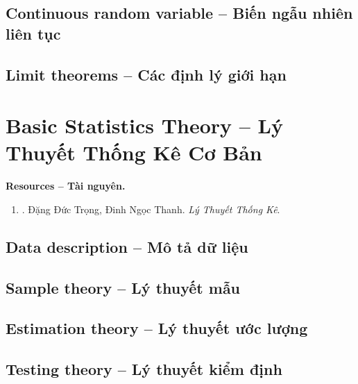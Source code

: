 \documentclass{article}
\begin{document}

\subsection{Continuous random variable -- Biến ngẫu nhiên liên tục}


\subsection{Limit theorems -- Các định lý giới hạn}


\section{Basic Statistics Theory -- Lý Thuyết Thống Kê Cơ Bản}
\textbf{\textsf{Resources -- Tài nguyên.}}
\begin{enumerate}
	\item \cite{Trong_Thanh_thong_ke}. {\sc Đặng Đức Trọng, Đinh Ngọc Thanh}. {\it Lý Thuyết Thống Kê}.
\end{enumerate}

\subsection{Data description -- Mô tả dữ liệu}


\subsection{Sample theory -- Lý thuyết mẫu}


\subsection{Estimation theory -- Lý thuyết ước lượng}


\subsection{Testing theory -- Lý thuyết kiểm định}
\end{document}
